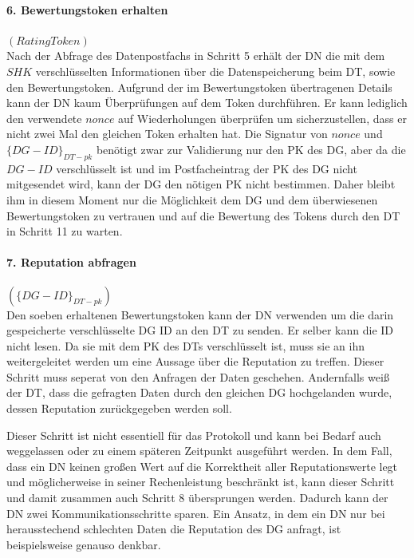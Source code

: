 \documentclass[
	fontsize=11pt,
	headings=small,
	parskip=half,           %
	bibliography=totoc,
	numbers=noenddot,       %
	open=any,               %
]{scrreprt}
\begin{document}
\paragraph{6. Bewertungstoken erhalten}$(RatingToken)$\\
Nach der Abfrage des Datenpostfachs in Schritt 5 erhält der DN die mit dem $SHK$ verschlüsselten Informationen über die Datenspeicherung beim DT, sowie den Bewertungstoken. Aufgrund der im Bewertungstoken übertragenen Details kann der DN kaum Überprüfungen auf dem Token durchführen. Er kann lediglich den verwendete $nonce$ auf Wiederholungen überprüfen um sicherzustellen, dass er nicht zwei Mal den gleichen Token erhalten hat. Die Signatur von $nonce$ und ${\{DG-ID\}}_{DT-pk}$ benötigt zwar zur Validierung nur den PK des DG, aber da die $DG-ID$ verschlüsselt ist und im Postfacheintrag der PK des DG nicht mitgesendet wird, kann der DG den nötigen PK nicht bestimmen. Daher bleibt ihm in diesem Moment nur die Möglichkeit dem DG und dem überwiesenen Bewertungstoken zu vertrauen und auf die Bewertung des Tokens durch den DT in Schritt 11 zu warten.

\paragraph{7. Reputation abfragen}$({\{DG-ID\}}_{DT-pk})$\\
Den soeben erhaltenen Bewertungstoken kann der DN verwenden um die darin gespeicherte verschlüsselte DG ID an den DT zu senden. Er selber kann die ID nicht lesen. Da sie mit dem PK des DTs verschlüsselt ist, muss sie an ihn weitergeleitet werden um eine Aussage über die Reputation zu treffen. Dieser Schritt muss seperat von den Anfragen der Daten geschehen. Andernfalls weiß der DT, dass die gefragten Daten durch den gleichen DG hochgelanden wurde, dessen Reputation zurückgegeben werden soll.

Dieser Schritt ist nicht essentiell für das Protokoll und kann bei Bedarf auch weggelassen oder zu einem späteren Zeitpunkt ausgeführt werden. In dem Fall, dass ein DN keinen großen Wert auf die Korrektheit aller Reputationswerte legt und möglicherweise in seiner Rechenleistung beschränkt ist, kann dieser Schritt und damit zusammen auch Schritt 8 übersprungen werden. Dadurch kann der DN zwei Kommunikationsschritte sparen. Ein Ansatz, in dem ein DN nur bei herausstechend schlechten Daten die Reputation des DG anfragt, ist beispielsweise genauso denkbar.
\end{document}
